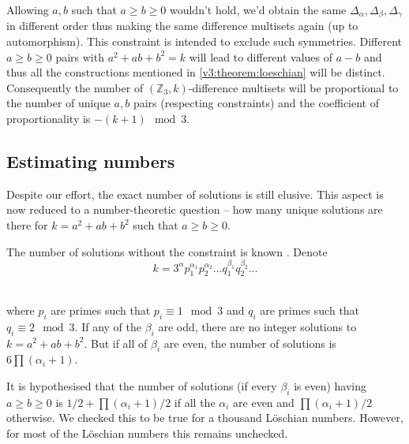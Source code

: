     \begin{remark}
        Allowing $a,b$ such that $a \geq b \geq 0$ wouldn't hold, we'd obtain the same $\Delta_\alpha, \Delta_\beta, \Delta_\gamma$ in different order thus making the same difference multisets again (up to automorphism). This constraint is intended to exclude such symmetries.
        Different $a \geq b \geq 0$ pairs with $a^2+ab+b^2=k$ will lead to different values of $a-b$ and thus all the constructions mentioned in \ref{v3:theorem:loeschian} will be distinct. Consequently the number of $(\mathbb Z_3,k)$-difference multisets will be proportional to the number of unique $a,b$ pairs (respecting constraints) and the coefficient of proportionality is $-(k+1) \mod 3$.
    \end{remark}

    \subsection{Estimating numbers}
        Despite our effort, the exact number of solutions is still elusive. This aspect is now reduced to a number-theoretic question -- how many unique solutions are there for $k=a^2+ab+b^2$ such that $a\geq b\geq 0$.

        The number of solutions without the constraint is known \cite{marmon2005hexagonal}. Denote
        \begin{equation}
            k=3^\alpha p_1^{\alpha_1}p_2^{\alpha_2}\ldots q_1^{\beta_1}q_2^{\beta_2}\ldots
        \end{equation}\
        
        where $p_i$ are primes such that $p_i \equiv 1 \mod 3$ and $q_i$ are primes such that $q_i \equiv 2 \mod 3$. If any of the $\beta_i$ are odd, there are no integer solutions to $k=a^2+ab+b^2$. But if all of $\beta_i$ are even, the number of solutions is $6\prod (\alpha_i +1)$.
        
        It is hypothesised \cite{nair2004elementary} that the number of solutions (if every $\beta_i$ is even) having $a \geq b \geq 0$ is $1/2 + \prod (\alpha_i +1)/2$ if all the $\alpha_i$ are even and $\prod (\alpha_i +1)/2$ otherwise. We checked this to be true for a thousand Löschian numbers. However, for most of the Löschian numbers this remains unchecked.
